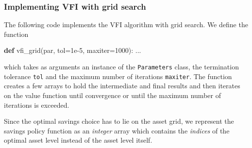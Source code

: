 \documentclass{scrartcl}
\newenvironment{Shaded}{}{}
\newcommand{\KeywordTok}[1]{\textcolor[rgb]{0.00,0.44,0.13}{\textbf{{#1}}}}
\newcommand{\DecValTok}[1]{\textcolor[rgb]{0.25,0.63,0.44}{{#1}}}
\newcommand{\FloatTok}[1]{\textcolor[rgb]{0.25,0.63,0.44}{{#1}}}
\newcommand{\NormalTok}[1]{{#1}}
\newcommand{\OperatorTok}[1]{\textcolor[rgb]{0.40,0.40,0.40}{{#1}}}
\begin{document}
    \begin{center}
    \end{center}
    
    \hypertarget{implementing-vfi-with-grid-search}{%
\subsubsection*{Implementing VFI with grid
search}\label{implementing-vfi-with-grid-search}}

The following code implements the VFI algorithm with grid search. We
define the function

\begin{Shaded}
\begin{Highlighting}[]
\KeywordTok{def}\NormalTok{ vfi\_grid(par, tol}\OperatorTok{=}\FloatTok{1e{-}5}\NormalTok{, maxiter}\OperatorTok{=}\DecValTok{1000}\NormalTok{):}
\NormalTok{    ...}
\end{Highlighting}
\end{Shaded}

which takes as arguments an instance of the \texttt{Parameters} class,
the termination tolerance \texttt{tol} and the maximum number of
iterations \texttt{maxiter}. The function creates a few arrays to hold
the intermediate and final results and then iterates on the value
function until convergence or until the maximum number of iterations is
exceeded.

Since the optimal savings choice has to lie on the asset grid, we
represent the savings policy function as an \emph{integer} array which
contains the \emph{indices} of the optimal asset level instead of the
asset level itself.
\end{document}
